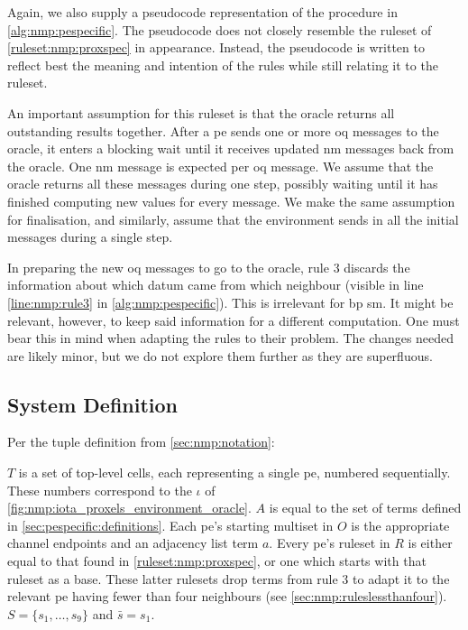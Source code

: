 Again, we also supply a pseudocode representation of the procedure in \autoref{alg:nmp:pespecific}.  The pseudocode does not closely resemble the ruleset of \autoref{ruleset:nmp:proxspec} in appearance.  Instead, the pseudocode is written to reflect best the meaning and intention of the rules while still relating it to the ruleset.

An important assumption for this ruleset is that the oracle returns all outstanding results together.  After a \gls{pe} sends one or more \gls{oq} messages to the oracle, it enters a blocking wait until it receives updated \gls{nm} messages back from the oracle.  One \gls{nm} message is expected per \gls{oq} message.  We assume that the oracle returns all these messages during one step, possibly waiting until it has finished computing new values for every message.  We make the same assumption for finalisation, and similarly, assume that the environment sends in all the initial messages during a single step.

In preparing the new \gls{oq} messages to go to the oracle, rule 3 discards the information about which datum came from which neighbour (visible in line \ref{line:nmp:rule3} in \autoref{alg:nmp:pespecific}).  This is irrelevant for \gls{bp} \gls{sm}.  It might be relevant, however, to keep said information for a different computation.  One must bear this in mind when adapting the rules to their problem.  The changes needed are likely minor, but we do not explore them further as they are superfluous.

\subsection{System Definition}
Per the tuple definition from \autoref{sec:nmp:notation}:

\(T\) is a set of top-level cells, each representing a single \gls{pe}, numbered sequentially.  These numbers correspond to the \(\iota\) of \autoref{fig:nmp:iota_proxels_environment_oracle}.  \(A\) is equal to the set of terms defined in \autoref{sec:pespecific:definitions}.  Each \gls{pe}'s starting multiset in \(O\) is the appropriate channel endpoints and an adjacency list term \(a\).  Every \gls{pe}'s ruleset in \(R\) is either equal to that found in \autoref{ruleset:nmp:proxspec}, or one which starts with that ruleset as a base.  These latter rulesets drop terms from rule 3 to adapt it to the relevant \gls{pe} having fewer than four neighbours (see \autoref{sec:nmp:ruleslessthanfour}).  \(S = \{s_1, \dots, s_9\}\) and \(\bar{s} = s_1\).

